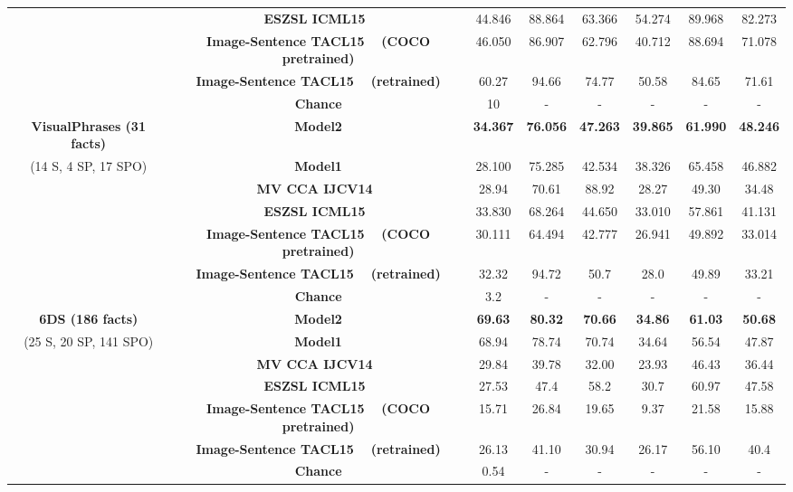 \documentclass[runningheads]{llncs}
\begin{document}
{\begin{tabular}{|c|c|ccc|ccc|}
          & \textbf{ESZSL ICML15~\cite{romera2015embarrassingly}} & 44.846 & 88.864 & 63.366 & 54.274 & 89.968 & 82.273  \\
       & \textbf{Image-Sentence TACL15  ~\cite{kiros2014unifying} (COCO pretrained)} & 46.050 & 86.907 & 62.796 & 40.712 & 88.694 & 71.078  \\
              & \textbf{Image-Sentence TACL15  ~\cite{kiros2014unifying} (retrained) } & 60.27 & 94.66 & 74.77 & 50.58 & 84.65 & 71.61  \\
              \textbf{} & \textbf{Chance} & 10 & - & - & - & - & - \\
                  \hline
   \textbf{VisualPhrases (31 facts)}    & \textbf{Model2} & \textbf{34.367} & \textbf{76.056} & \textbf{47.263} & \textbf{39.865} & \textbf{61.990} & \textbf{48.246} \\
 (14 S, 4 SP, 17 SPO)   & \textbf{Model1} & 28.100 & 75.285 & 42.534 & 38.326 & 65.458 & 46.882  \\
     & \textbf{MV CCA IJCV14~\cite{gong2014multi}} & 28.94 & 70.61 & 88.92 & {28.27} & {49.30} & {34.48} \\
 &   \textbf{ESZSL ICML15~\cite{romera2015embarrassingly}} & 33.830 & 68.264 & 44.650 & 33.010 & 57.861 & 41.131  \\
  &  \textbf{Image-Sentence TACL15  ~\cite{kiros2014unifying} (COCO pretrained)} & 30.111 & 64.494 & 42.777 & 26.941 & 49.892 & 33.014 \\
      &  \textbf{Image-Sentence TACL15   ~\cite{kiros2014unifying} (retrained)} & 32.32 & 94.72 & 50.7 & 28.0 & 49.89 & 33.21 \\
                 \textbf{} & \textbf{Chance} & 3.2 & - & - & - & - & - \\
        \hline
 \textbf{6DS (186 facts)}  &   \textbf{Model2} & \textbf{69.63} & \textbf{80.32} & \textbf{70.66} &\textbf{ 34.86} & \textbf{61.03 }& \textbf{50.68 }\\
  (25 S, 20 SP, 141 SPO)  &  \textbf{Model1} &{ 68.94} & {78.74} & 70.74 & 34.64 & 56.54 & 47.87 \\
    &  \textbf{MV CCA IJCV14~\cite{gong2014multi}} & 29.84 & 39.78 & 32.00 & 23.93 & 46.43 & 36.44 \\
  &  \textbf{ESZSL ICML15~\cite{romera2015embarrassingly}} & 27.53 & 47.4 & 58.2 & 30.7 & 60.97  & 47.58 \\
   & \textbf{Image-Sentence TACL15  ~\cite{kiros2014unifying} (COCO pretrained)} & 15.71 & 26.84 & 19.65 & 9.37  & 21.58 & 15.88 \\
      & \textbf{Image-Sentence TACL15  ~\cite{kiros2014unifying} (retrained)} & 26.13 & 41.10 & 30.94 & 26.17  & 56.10 & 40.4  \\
      \textbf{} & \textbf{Chance} &0.54 & - & - & - & - & - \\
\hline
    \end{tabular}
    }
\end{document}
